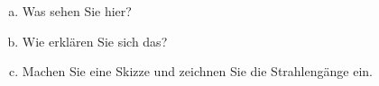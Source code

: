 
\begin{frame}
	\begin{center}%
	\end{center}%
\begin{enumerate} [a)]
\item Was sehen Sie hier?
\item Wie erklären Sie sich das?
\item Machen Sie eine Skizze und zeichnen Sie die Strahlengänge ein.
\end{enumerate}%
\end{frame}

